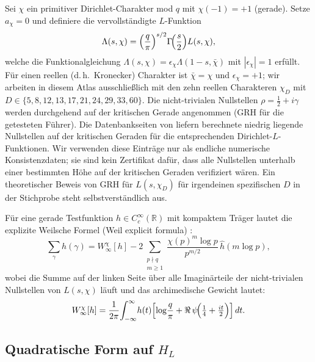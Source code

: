 \documentclass[a4paper,10pt,twocolumn]{article}
\theoremstyle{definition}
\theoremstyle{remark}
\newcommand{\chifn}{\chi}
\newcommand{\halfline}{\tfrac{1}{2}}
\begin{document}
Sei $\chifn$ ein primitiver Dirichlet-Charakter mod $q$ mit
$\chifn(-1)=+1$ (gerade). Setze $a_{\chifn}=0$ und definiere die vervollständigte
$L$-Funktion
\[
  \Lambda(s,\chifn)
    =\Bigl(\frac{q}{\pi}\Bigr)^{s/2}\Gamma\!\Bigl(\frac{s}{2}\Bigr)
      L(s,\chifn),
\]
welche die Funktionalgleichung
$\Lambda(s,\chifn)=\epsilon_{\chifn}\Lambda(1-s,\bar\chifn)$ mit
$|\epsilon_{\chifn}|=1$ erfüllt. Für einen reellen (d.\,h.\ Kronecker) Charakter
ist $\bar\chifn=\chifn$ und $\epsilon_{\chifn}=+1$; wir arbeiten in diesem Atlas ausschließlich
mit den zehn reellen Charakteren $\chifn_D$ mit $D\in\{5,8,12,13,17,21,
24,29,33,60\}$. Die nicht-trivialen Nullstellen
$\rho=\halfline+i\gamma$ werden durchgehend auf der kritischen Gerade angenommen
(GRH für die getesteten Führer). Die Datenbankseiten von \cite{LMFDB}
liefern berechnete niedrig liegende Nullstellen auf der kritischen
Geraden für die entsprechenden Dirichlet-$L$-Funktionen. Wir verwenden
diese Einträge nur als endliche numerische Konsistenzdaten; sie sind
kein Zertifikat dafür, dass alle Nullstellen unterhalb einer bestimmten
Höhe auf der kritischen Geraden verifiziert wären. Ein theoretischer
Beweis von GRH für $L(s,\chifn_D)$ für irgendeinen spezifischen $D$ in
der Stichprobe steht selbstverständlich aus.

Für eine gerade Testfunktion $h\in C_c^\infty(\mathbb{R})$ mit kompaktem Träger
lautet die explizite Weilsche Formel (Weil explicit formula)
\cite{Weil1952,IwaniecKowalski}:
\begin{equation}
\label{eq:weil}
  \sum_{\gamma}h(\gamma)
    = W^{\chifn}_\infty[h]
    - 2\sum_{\substack{p\nmid q\\m\geq 1}}
      \frac{\chifn(p)^m\log p}{p^{m/2}}\,\hat h(m\log p),
\end{equation}
wobei die Summe auf der linken Seite über alle Imaginärteile der nicht-trivialen
Nullstellen von $L(s,\chifn)$ läuft und das archimedische Gewicht lautet:
\[
  W^{\chifn}_\infty[h]
    = \frac{1}{2\pi}\!\int_{-\infty}^{\infty}\! h(t)
      \Bigl[\log\!\frac{q}{\pi} + \Re\,\psi\!\Bigl(\tfrac14+\tfrac{it}{2}\Bigr)\Bigr]\,dt.
\]

\subsection{\texorpdfstring{Quadratische Form auf $H_L$}{Quadratische Form auf HL}}
\end{document}
